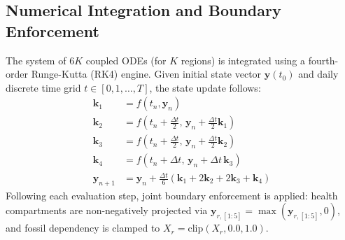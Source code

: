 \documentclass[conference]{IEEEtran}
\renewcommand{\_}{\textunderscore\allowbreak{}}%
\begin{document}
\subsection{Numerical Integration and Boundary Enforcement}
The system of $6K$ coupled ODEs (for $K$ regions) is integrated using a fourth-order Runge-Kutta (RK4) engine. Given initial state vector $\mathbf{y}(t_0)$ and daily discrete time grid $t \in [0, 1, \dots, T]$, the state update follows:
\begin{align}
\mathbf{k}_1 &= f(t_n, \mathbf{y}_n) \nonumber \\
\mathbf{k}_2 &= f\left(t_n + \frac{\Delta t}{2}, \, \mathbf{y}_n + \frac{\Delta t}{2} \mathbf{k}_1\right) \nonumber \\
\mathbf{k}_3 &= f\left(t_n + \frac{\Delta t}{2}, \, \mathbf{y}_n + \frac{\Delta t}{2} \mathbf{k}_2\right) \nonumber \\
\mathbf{k}_4 &= f(t_n + \Delta t, \, \mathbf{y}_n + \Delta t \, \mathbf{k}_3) \nonumber \\
\mathbf{y}_{n+1} &= \mathbf{y}_n + \frac{\Delta t}{6} (\mathbf{k}_1 + 2\mathbf{k}_2 + 2\mathbf{k}_3 + \mathbf{k}_4)
\end{align}
Following each evaluation step, joint boundary enforcement is applied: health compartments are non-negatively projected via $\mathbf{y}_{r, [1:5]} = \max(\mathbf{y}_{r, [1:5]}, 0)$, and fossil dependency is clamped to $X_r = \text{clip}(X_r, 0.0, 1.0)$.
\end{document}
